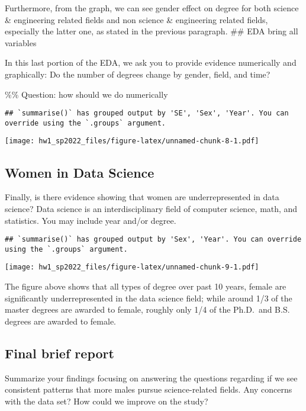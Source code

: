 \documentclass[
]{article}
\begin{document}
Furthermore, from the graph, we can see gender effect on degree for both
science \& engineering related fields and non science \& engineering
related fields, especially the latter one, as stated in the previous
paragraph. \#\# EDA bring all variables

In this last portion of the EDA, we ask you to provide evidence
numerically and graphically: Do the number of degrees change by gender,
field, and time?

\%\% Question: how should we do numerically

\begin{verbatim}
## `summarise()` has grouped output by 'SE', 'Sex', 'Year'. You can override using the `.groups` argument.
\end{verbatim}

\texttt{[image: hw1\_sp2022\_files/figure-latex/unnamed-chunk-8-1.pdf]}

\hypertarget{women-in-data-science}{%
\subsection{Women in Data Science}\label{women-in-data-science}}

Finally, is there evidence showing that women are underrepresented in
data science? Data science is an interdisciplinary field of computer
science, math, and statistics. You may include year and/or degree.

\begin{verbatim}
## `summarise()` has grouped output by 'Sex', 'Year'. You can override using the `.groups` argument.
\end{verbatim}

\texttt{[image: hw1\_sp2022\_files/figure-latex/unnamed-chunk-9-1.pdf]}

The figure above shows that all types of degree over past 10 years,
female are significantly underrepresented in the data science field;
while around 1/3 of the master degrees are awarded to female, roughly
only 1/4 of the Ph.D.~and B.S. degrees are awarded to female.

\hypertarget{final-brief-report}{%
\subsection{Final brief report}\label{final-brief-report}}

Summarize your findings focusing on answering the questions regarding if
we see consistent patterns that more males pursue science-related
fields. Any concerns with the data set? How could we improve on the
study?
\end{document}
